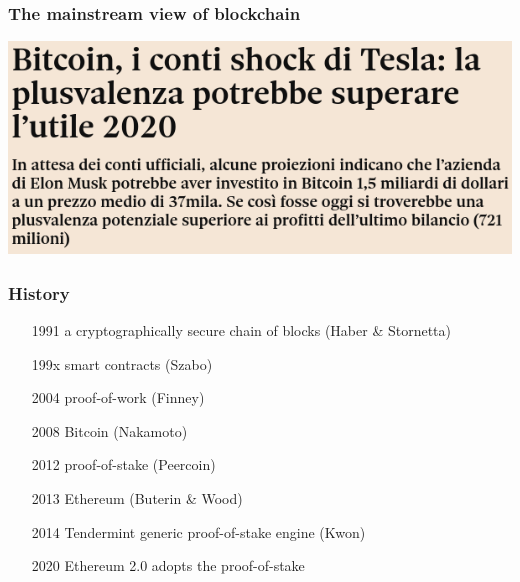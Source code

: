 \documentclass[11pt]{beamer}  %
\begin{document}
\begin{frame}
\end{frame}

\begin{frame}\frametitle{The mainstream view of blockchain}

  \begin{center}
    \includegraphics[scale=0.4,clip=false]{pictures/tesla.png}
  \end{center}

\end{frame}

\begin{frame}\frametitle{History}

  \begin{itemize}
  \item[1991] a cryptographically secure chain of blocks (Haber \& Stornetta)
  \item[199x] smart contracts (Szabo)
  \item[2004] proof-of-work (Finney)
  \item[2008] Bitcoin (Nakamoto)
  \item[2012] proof-of-stake (Peercoin)
  \item[2013] Ethereum (Buterin \& Wood)
  \item[2014] Tendermint generic proof-of-stake engine (Kwon)
  \item[2020] Ethereum 2.0 adopts the proof-of-stake
  \end{itemize}
  
\end{frame}
\end{document}
